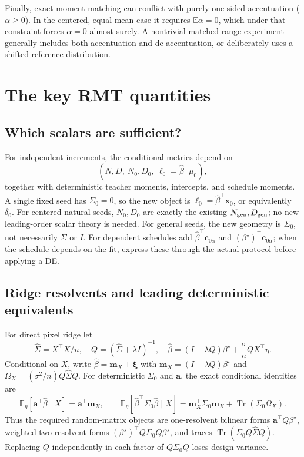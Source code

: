 \documentclass[11pt]{article}
\newcommand{\E}{\mathbb E}
\newcommand{\Tr}{\operatorname{Tr}}
\newcommand{\bstar}{{\beta^{\star}}}
\newcommand{\bhat}{\hat{\beta}}
\newcommand{\x}{\mathbf{x}}
\begin{document}
Finally, exact moment matching can conflict with purely one-sided
accentuation ($\alpha\geq0$). In the centered, equal-mean case it requires
$\E\alpha=0$, which under that constraint forces $\alpha=0$ almost surely.
A nontrivial matched-range experiment generally includes both accentuation
and de-accentuation, or deliberately uses a shifted reference distribution.

\section{The key RMT quantities}
\subsection{Which scalars are sufficient?}
For independent increments, the conditional metrics depend on
\begin{equation}\boxed{
 (N,D,\ N_0,D_0,\ \ell_0=\bhat^\top\mu_0),}
 \label{eq:core}
\end{equation}
together with deterministic teacher moments, intercepts, and schedule
moments. A single fixed seed has $\Sigma_0=0$, so the new object is
$\ell_0=\bhat^\top\x_0$, or equivalently $\delta_0$.
For centered natural seeds, $N_0,D_0$ are exactly the existing
$N_{\rm gen},D_{\rm gen}$; no new leading-order scalar theory is needed.
For general seeds, the new geometry is $\Sigma_0$, not necessarily $\Sigma$ or $I$.
For dependent schedules add $\bhat^\top\bm c_{0\alpha}$ and $(\bstar)^\top\bm c_{0\alpha}$;
when the schedule depends on the fit, express these through the actual
protocol before applying a DE.

\subsection{Ridge resolvents and leading deterministic equivalents}
For direct pixel ridge let
\[
 \hat\Sigma=X^\top X/n,\quad Q=(\hat\Sigma+\lambda I)^{-1},\quad
 \bhat=(I-\lambda Q)\bstar+\frac{\sigma}{n}QX^\top\eta.
\]
Conditional on $X$, write $\bhat=\bm m_X+\bm\xi$ with
$\bm m_X=(I-\lambda Q)\bstar$ and
$\Omega_X=(\sigma^2/n)Q\hat\Sigma Q$. For deterministic $\Sigma_0$ and
$\bm a$, the exact conditional identities are
\[
 \E_\eta[\bm a^\top\bhat\mid X]=\bm a^\top\bm m_X,\qquad
 \E_\eta[\bhat^\top \Sigma_0\bhat\mid X]
 =\bm m_X^\top \Sigma_0\bm m_X+\Tr(\Sigma_0\Omega_X).
\]
Thus the required random-matrix objects are one-resolvent bilinear forms
$\bm a^\top Q\bstar$, weighted two-resolvent forms
$(\bstar)^\top Q\Sigma_0 Q\bstar$, and traces $\Tr(\Sigma_0 Q\hat\Sigma Q)$.
Replacing $Q$ independently in each factor of $Q\Sigma_0 Q$ loses design variance.
\end{document}
